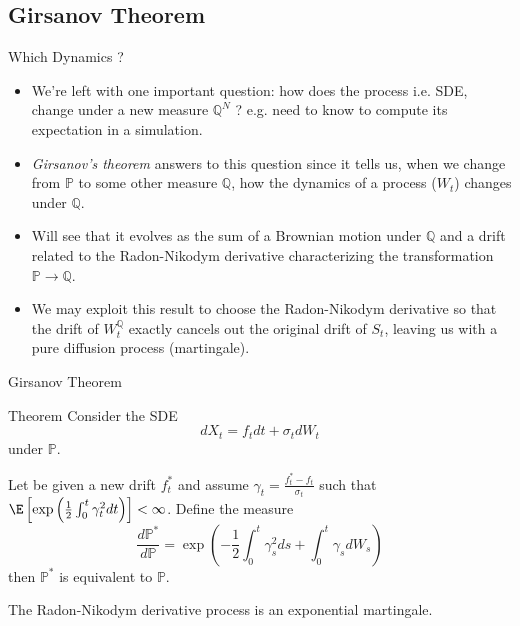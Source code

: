 \documentclass{beamer}
\begin{document}
\subsection{Girsanov Theorem}
\begin{frame}{Which Dynamics ?}
	\begin{itemize}
		\item<1-> We're left with one important question:
		\textcolor{maincolor}{how does the process i.e. SDE, change under a new measure $\mathbb{Q}^N$ ?} e.g. need to know to compute its expectation in a simulation.
		\item<2-> \emph{Girsanov's theorem} answers to this question since it tells us, when we change from $\mathbb{P}$ to some other measure $\mathbb{Q}$, how the dynamics of a process ($W_t$) changes under $\mathbb{Q}$.
		\item<3-> Will see that it evolves as the sum of a Brownian motion under $\mathbb{Q}$ and a drift related to the Radon-Nikodym derivative characterizing the transformation $\mathbb{P}\rightarrow\mathbb{Q}$.
		\item<4-> We may exploit this result to choose the Radon-Nikodym derivative so that the drift of $W_t^\mathbb{Q}$ exactly cancels out the original drift of $S_t$, leaving us with a pure diffusion process (martingale).
	\end{itemize}
\end{frame}

\begin{frame}{Girsanov Theorem}
	\begin{block}{Theorem}
		Consider the SDE
		\begin{equation*}
			dX_t = f_t dt + \sigma_t dW_t
		\end{equation*}
		under $\mathbb{P}$.
		
		Let be given a new drift $f^*_t$ and assume $\gamma_t=\frac{f_t^*-f_t}{\sigma_t}$ such that $\E\left[\exp\left(\frac{1}{2}\int_0^t\gamma_t^2dt\right)\right]<\infty$.
		Define the measure
		\begin{equation}
			\frac{d\mathbb{P}^*}{d\mathbb{P}}=\exp\left(-\frac{1}{2}\int_0^t \gamma_s^2 ds + \int_0^t \gamma_s dW_s \right)
		\end{equation}
		then $\mathbb{P}^*$ is equivalent to $\mathbb{P}$.
		
		The Radon-Nikodym derivative process is an \textcolor{maincolor}{exponential martingale}.
	\end{block}
\end{frame}
\end{document}
